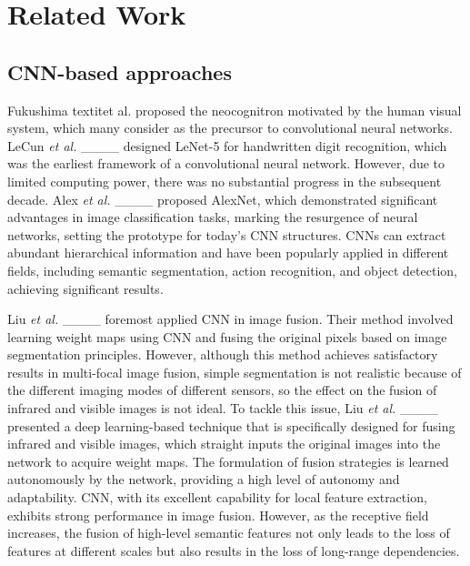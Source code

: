 \section{Related Work}
\label{related}
\noindent
\subsection{CNN-based approaches}
Fukushima textit{et al.} proposed the neocognitron motivated by the human visual system, which many consider as the precursor to convolutional neural networks.
LeCun \textit{et al.} ____ designed LeNet-5 for handwritten digit recognition, which was the earliest framework of a convolutional neural network.
However, due to limited computing power, there was no substantial progress in the subsequent decade.
Alex \textit{et al.} ____ proposed AlexNet, which demonstrated significant advantages in image classification tasks, marking the resurgence of neural networks, setting the prototype for today's CNN structures.
CNNs can extract abundant hierarchical information and have been popularly applied in different fields, including semantic segmentation, action recognition, and object detection, achieving significant results.

Liu \textit{et al.} ____ foremost applied CNN in image fusion. Their method involved learning weight maps using CNN and fusing the original pixels based on image segmentation principles.
However, although this method achieves satisfactory results in multi-focal image fusion, simple segmentation is not realistic because of the different imaging modes of different sensors, so the effect on the fusion of infrared and visible images is not ideal.
To tackle this issue, Liu \textit{et al.} ____ presented a deep learning-based technique that is specifically designed for fusing infrared and visible images, which straight inputs the original images into the network to acquire weight maps.
The formulation of fusion strategies is learned autonomously by the network, providing a high level of autonomy and adaptability.
CNN, with its excellent capability for local feature extraction, exhibits strong performance in image fusion.
However, as the receptive field increases, the fusion of high-level semantic features not only leads to the loss of features at different scales but also results in the loss of long-range dependencies.

